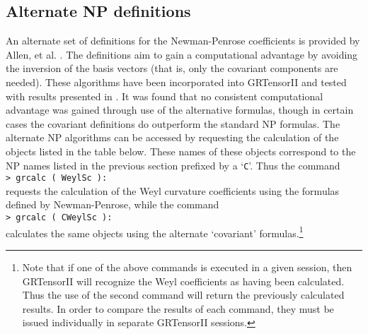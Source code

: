 \documentclass{article}
\begin{document}
\subsection*{Alternate NP definitions}\label{sec:altNP}
%
An alternate set of definitions for the Newman-Penrose coefficients is
provided by Allen, et al. \cite{allen/etal:1994}. The definitions
aim to gain a computational advantage by avoiding the inversion of
the basis vectors (that is, only the covariant components are needed).
These algorithms have been incorporated into GRTensorII and tested
with results presented in \cite{pmsl96}. It was found that no consistent
computational advantage was gained through use of the alternative
formulas, though in certain cases the covariant
definitions do outperform the standard NP formulas. The alternate
NP algorithms can be accessed by requesting the calculation of the
objects listed in the table below. These names of these objects correspond
to the NP names listed in the previous section prefixed by a `\texttt{C}'.
Thus the command\\

\noindent\texttt{> grcalc ( WeylSc ):}\\

\noindent requests the calculation of the Weyl curvature coefficients using
the formulas defined by Newman-Penrose, while the command\\

\noindent\texttt{> grcalc ( CWeylSc ):}\\

\noindent calculates the same objects using the alternate `covariant'
formulas.\footnote{Note that if one of the above commands is executed
in a given session, then GRTensorII will recognize the Weyl
coefficients as having been calculated. Thus the use of the second
command will return the previously calculated results. In order to
compare the results of each command, they must be issued individually
in separate GRTensorII sessions.}
\end{document}
